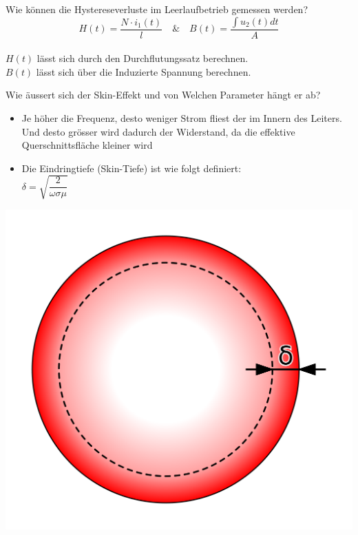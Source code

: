 \begin{karte}{Wie können die Hystereseverluste im Leerlaufbetrieb gemessen werden?}
	\\
	\begin{equation*}
		H(t) = \frac{N\cdot i_1(t)}{l}  
		\quad \& \quad 
		B(t) = \frac{\int u_2(t) dt}{A}
	\end{equation*}\\[2pt]
	$H(t)$ lässt sich durch den Durchflutungssatz berechnen.\\
	$B(t)$ lässt sich über die Induzierte Spannung berechnen.\\ 
\end{karte}

\begin{karte}{Wie äussert sich der Skin-Effekt und von Welchen Parameter hängt er ab?}
	\begin{minipage}{0.6\textwidth}
		\begin{itemize}
			\item Je höher die Frequenz, desto weniger Strom fliest der im Innern des Leiters. Und desto grösser wird dadurch der Widerstand, da die effektive Querschnittsfläche kleiner wird
			\item Die Eindringtiefe (Skin-Tiefe) ist wie folgt definiert:\\[5pt]
			\large
			$ \delta=\sqrt{\dfrac{2}{\omega \sigma \mu}} $
		\end{itemize}
	\end{minipage}
	\begin{minipage}{0.39\textwidth}
		\includegraphics[width=\textwidth]{bilder/2_SkinEfekt.png}
	\end{minipage}
	
\end{karte}
